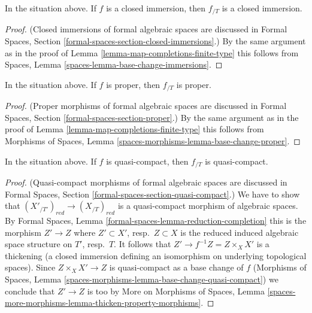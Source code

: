 \begin{lemma}
\label{lemma-closed-immersion-gives-closed-immersion}
In the situation above. If $f$ is a closed immersion, then
$f_{/T}$ is a closed immersion.
\end{lemma}

\begin{proof}
(Closed immersions of formal algebraic spaces are discussed in
Formal Spaces, Section
\ref{formal-spaces-section-closed-immersions}.)
By the same argument as in the proof of
Lemma \ref{lemma-map-completions-finite-type} this follows from
Spaces, Lemma
\ref{spaces-lemma-base-change-immersions}.
\end{proof}

\begin{lemma}
\label{lemma-proper-gives-proper}
In the situation above. If $f$ is proper, then $f_{/T}$ is proper.
\end{lemma}

\begin{proof}
(Proper morphisms of formal algebraic spaces are discussed in
Formal Spaces, Section \ref{formal-spaces-section-proper}.)
By the same argument as in the proof of
Lemma \ref{lemma-map-completions-finite-type} this follows from
Morphisms of Spaces, Lemma
\ref{spaces-morphisms-lemma-base-change-proper}.
\end{proof}

\begin{lemma}
\label{lemma-quasi-compact-gives-quasi-compact}
In the situation above. If $f$ is quasi-compact, then
$f_{/T}$ is quasi-compact.
\end{lemma}

\begin{proof}
(Quasi-compact morphisms of formal algebraic spaces are discussed in
Formal Spaces, Section \ref{formal-spaces-section-quasi-compact}.)
We have to show that $(X'_{/T'})_{red} \to (X_{/T})_{red}$ is a quasi-compact
morphism of algebraic spaces. By
Formal Spaces, Lemma \ref{formal-spaces-lemma-reduction-completion}
this is the morphism $Z' \to Z$ where $Z' \subset X'$, resp.\ $Z \subset X$
is the reduced induced algebraic space structure on $T'$, resp.\ $T$.
It follows that $Z' \to f^{-1}Z = Z \times_X X'$ is a thickening (a closed
immersion defining an isomorphism on underlying topological spaces).
Since $Z \times_X X' \to Z$ is quasi-compact as a base change of $f$
(Morphisms of Spaces, Lemma
\ref{spaces-morphisms-lemma-base-change-quasi-compact})
we conclude that $Z' \to Z$ is too by
More on Morphisms of Spaces, Lemma
\ref{spaces-more-morphisms-lemma-thicken-property-morphisms}.
\end{proof}

